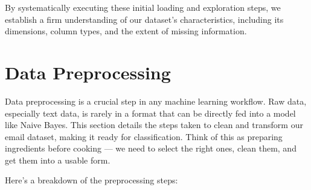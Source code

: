 \documentclass[12pt,letterpaper]{article}
\begin{document}
By systematically executing these initial loading and exploration steps, we establish a firm understanding of our dataset's characteristics, including its dimensions, column types, and the extent of missing information.

\section{Data Preprocessing}

Data preprocessing is a crucial step in any machine learning workflow. Raw data, especially text data, is rarely in a format that can be directly fed into a model like Naive Bayes. This section details the steps taken to clean and transform our email dataset, making it ready for classification. Think of this as preparing ingredients before cooking --- we need to select the right ones, clean them, and get them into a usable form.

Here's a breakdown of the preprocessing steps:
\end{document}

